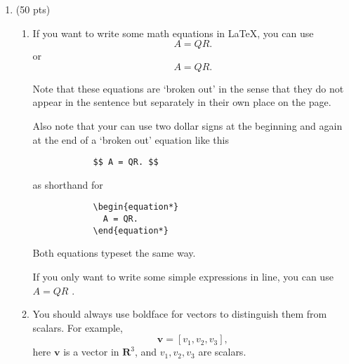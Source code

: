 \documentclass[11pt]{article}
\begin{document}

 \begin{enumerate}



    \item \label{Problem_01} (50 pts)


      \begin{enumerate}

        \item If you want to write some math equations in \LaTeX, you can use
          $$ A=QR. $$ or
          \begin{equation*}
            A = QR.
          \end{equation*}

          Note that these equations are `broken out' in the sense that they do not appear
          in the sentence but separately in their own place on the page.

          \vskip 06pt

          Also note that your can use two dollar signs at the beginning and again at the
          end of a `broken out' equation like this
          \begin{verbatim}
            $$ A = QR. $$
          \end{verbatim}
           as shorthand for
          \begin{verbatim}
            \begin{equation*}
              A = QR.
            \end{equation*}
          \end{verbatim}
          Both equations typeset the same way.

          \vskip 06pt

          If you only want to write some simple expressions in line, you can use $A=QR$ .

        \item You should always use boldface for vectors to distinguish them from scalars.
          For example,
          $$
            \mathbf{v}= [v_1, v_2, v_3],
          $$
          here $\mathbf{v}$ is a vector in $\mathbf{R}^3$, and $v_1, v_2, v_3$ are scalars.


\end{enumerate}
\end{enumerate}
\end{document}
